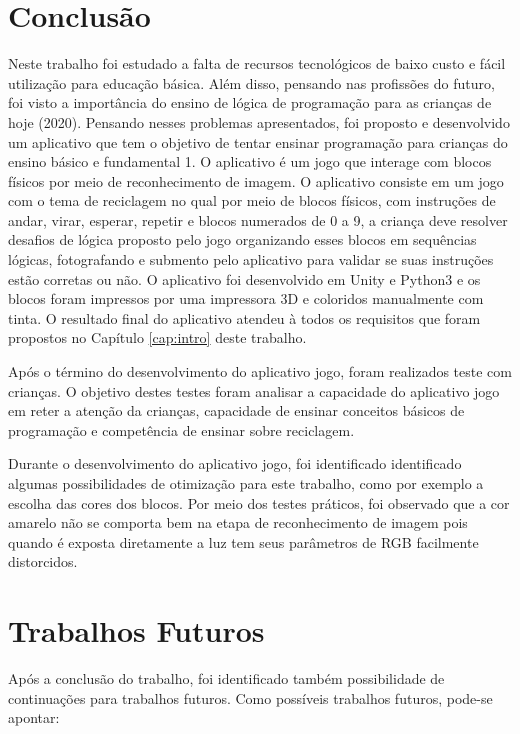 \section{Conclusão}


Neste trabalho foi estudado a falta de recursos tecnológicos de baixo custo e fácil utilização para educação básica. Além disso, pensando nas profissões do futuro, foi visto a importância do ensino de lógica de programação para as crianças de hoje (2020).
Pensando nesses problemas apresentados, foi proposto e desenvolvido um aplicativo que tem o objetivo de tentar ensinar programação para crianças do ensino básico e fundamental 1. O aplicativo é um jogo que interage com blocos físicos por meio de reconhecimento de imagem. O aplicativo consiste em um jogo com o tema de reciclagem no qual por meio de blocos físicos, com instruções de andar, virar, esperar, repetir e blocos numerados de 0 a 9, a criança deve resolver desafios de lógica proposto pelo jogo organizando esses blocos em sequências lógicas, fotografando e submento pelo aplicativo para validar se suas instruções estão corretas ou não. O aplicativo foi desenvolvido em Unity e Python3 e os blocos foram impressos por uma impressora 3D e coloridos manualmente com tinta. O resultado final do aplicativo atendeu à todos os requisitos que foram propostos no Capítulo \ref{cap:intro} deste trabalho.

Após o término do desenvolvimento do aplicativo jogo, foram realizados teste com crianças. O objetivo destes testes foram analisar a capacidade do aplicativo jogo em reter a atenção da crianças, capacidade de ensinar conceitos básicos de programação e competência de ensinar sobre reciclagem.


Durante o desenvolvimento do aplicativo jogo, foi identificado identificado algumas possibilidades de otimização para este trabalho, como por exemplo a escolha das cores dos blocos. Por meio dos testes práticos, foi observado que a cor amarelo não se comporta bem na etapa de reconhecimento de imagem pois quando é exposta diretamente a luz tem seus parâmetros de RGB facilmente distorcidos.


\clearpage

\section{Trabalhos Futuros}

Após a conclusão do trabalho, foi identificado também possibilidade de continuações para trabalhos futuros. Como possíveis trabalhos futuros, pode-se apontar:

